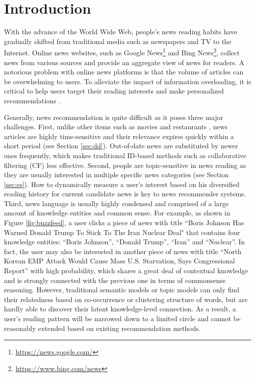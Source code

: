 \documentclass[sigconf]{acmart}
\begin{document}
\section{Introduction}
	With the advance of the World Wide Web, people's news reading habits have gradually shifted from traditional media such as newspapers and TV to the Internet.
	Online news websites, such as Google News\footnote{\url{https://news.google.com/}} and Bing News\footnote{\url{https://www.bing.com/news}}, collect news from various sources and provide an aggregate view of news for readers.
	A notorious problem with online news platforms is that the volume of articles can be overwhelming to users.
	To alleviate the impact of information overloading, it is critical to help users target their reading interests and make personalized recommendations \cite{phelan2009using, li2010contextual, liu2010personalized, son2013location, bansal2015content, okura2017embedding}.
	
	Generally, news recommendation is quite difficult as it poses three major challenges.
	First, unlike other items such as movies \cite{diao2014jointly} and restaurants \cite{fu2014user}, news articles are highly time-sensitive and their relevance expires quickly within a short period (see Section \ref{sec:dd}).
	Out-of-date news are substituted by newer ones frequently, which makes traditional ID-based methods such as collaborative filtering (CF) \cite{wang2011collaborative} less effective.
	Second, people are topic-sensitive in news reading as they are usually interested in multiple specific news categories (see Section \ref{sec:cs}).
	How to dynamically measure a user's interest based on his diversified reading history for current candidate news is key to news recommender systems.
	Third, news language is usually highly condensed and comprised of a large amount of knowledge entities and common sense.
	For example, as shown in Figure \ref{fig:buzzfeed}, a user clicks a piece of news with title ``\textsf{Boris Johnson Has Warned Donald Trump To Stick To The Iran Nuclear Deal}" that contains four knowledge entities: ``\textsf{Boris Johnson}'', ``\textsf{Donald Trump}'', ``\textsf{Iran}'' and ``\textsf{Nuclear}''.
	In fact, the user may also be interested in another piece of news with title ``\textsf{North Korean EMP Attack Would Cause Mass U.S. Starvation, Says Congressional Report}'' with high probability, which shares a great deal of contextual knowledge and is strongly connected with the previous one in terms of commonsense reasoning.
	However, traditional semantic models \cite{mikolov2013distributed} or topic models \cite{blei2003latent} can only find their relatedness based on co-occurrence or clustering structure of words, but are hardly able to discover their latent knowledge-level connection.
	As a result, a user's reading pattern will be narrowed down to a limited circle and cannot be reasonably extended based on existing recommendation methods.
	
\end{document}
